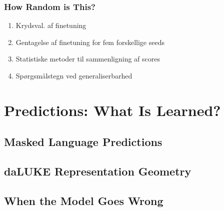 \documentclass[main.tex]{subfiles}
\begin{document}
\subsubsection{How Random is This?}
\begin{enumerate}
    \item Krydsval. af finetuning
    \item Gentagelse af finetuning for fem forskellige seeds
    \item Statistiske metoder til sammenligning af scores
    \item Spørgsmålstegn ved generaliserbarhed
\end{enumerate}

\section{Predictions: What Is Learned?}

\subsection{Masked Language Predictions}

\subsection{daLUKE Representation Geometry}

\subsection{When the Model Goes Wrong}
\end{document}
